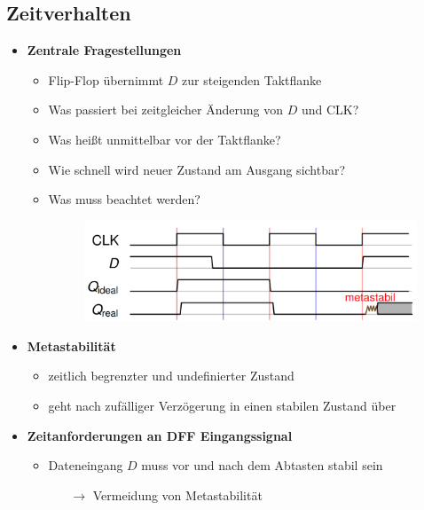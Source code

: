 \documentclass[11pt,a4paper]{article}
\begin{document}
\subsection{Zeitverhalten}
\begin{itemize}

\item \textbf{Zentrale Fragestellungen}
	\begin{itemize}
	
	\item Flip-Flop übernimmt $D$ zur steigenden Taktflanke
	\item Was passiert bei zeitgleicher Änderung von $D$ und CLK?
	\item Was heißt unmittelbar vor der Taktflanke?
	\item Wie schnell wird neuer Zustand am Ausgang sichtbar?
	\item Was muss beachtet werden?
	\item[] \begin{figure}[H]
				\begin{center}
				\includegraphics[height=3cm]{Bilder/zeitseq1}
				\end{center}
			\end{figure}
	
	
	\end{itemize}
	
\pagebreak	
	
\item \textbf{Metastabilität}
	\begin{itemize}
	\item zeitlich begrenzter und undefinierter Zustand
	\item geht nach zufälliger Verzögerung in einen stabilen Zustand über
	\end{itemize}
	
\item \textbf{Zeitanforderungen an DFF Eingangssignal}
	\begin{itemize}
	\item Dateneingang $D$ muss vor und nach dem Abtasten stabil sein
		\begin{itemize}
		\item[$\rightarrow$] Vermeidung von Metastabilität
		\end{itemize}
	

\end{itemize}
\end{itemize}
\end{document}
